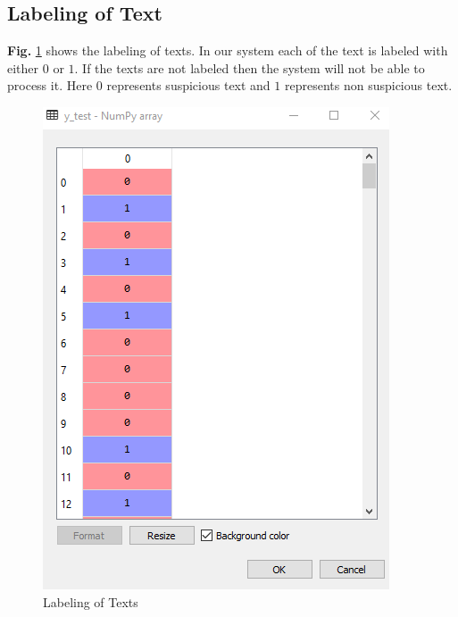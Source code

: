 \subsection{Labeling of Text}
\textbf{Fig.} \ref{fig:lbt} shows the labeling of texts.
In our system each of the text is labeled with either $0$ or $1$. If the texts are not labeled then the system will not be able to process it. Here $0$ represents suspicious text and $1$ represents non suspicious text. 
\begin{figure}[h!]
    \centering
    \includegraphics[scale=0.55]{Figures/label_of_text.PNG}
    \caption{Labeling of Texts}
    \label{fig:lbt}
\end{figure}
